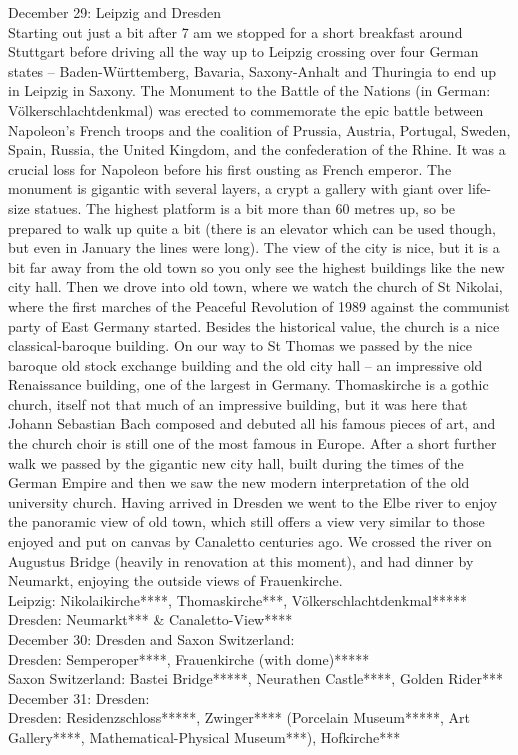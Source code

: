 December 29: Leipzig and Dresden\\
Starting out just a bit after 7 am we stopped for a short breakfast around Stuttgart before driving all the way up to Leipzig crossing over four German states -- Baden-W\"urttemberg, Bavaria, Saxony-Anhalt and Thuringia to end up in Leipzig in Saxony. The Monument to the Battle of the Nations (in German: V\"olkerschlachtdenkmal) was erected to commemorate the epic battle between Napoleon's French troops and the coalition of Prussia, Austria, Portugal, Sweden, Spain, Russia, the United Kingdom, and the confederation of the Rhine. It was a crucial loss for Napoleon before his first ousting as French emperor. The monument is gigantic with several layers, a crypt a gallery with giant over life-size statues. The highest platform is a bit more than 60 metres up, so be prepared to walk up quite a bit (there is an elevator which can be used though, but even in January the lines were long). The view of the city is nice, but it is a bit far away from the old town so you only see the highest buildings like the new city hall. Then we drove into old town, where we watch the church of St Nikolai, where the first marches of the Peaceful Revolution of 1989 against the communist party of East Germany started. Besides the historical value, the church is a nice classical-baroque building. On our way to St Thomas we passed by the nice baroque old stock exchange building and the old city hall -- an impressive old Renaissance building, one of the largest in Germany. Thomaskirche is a gothic church, itself not that much of an impressive building, but it was here that Johann Sebastian Bach composed and debuted all his famous pieces of art, and the church choir is still one of the most famous in Europe. After a short further walk we passed by the gigantic new city hall, built during the times of the German Empire and then we saw the new modern interpretation of the old university church. Having arrived in Dresden we went to the Elbe river to enjoy the panoramic view of old town, which still offers a view very similar to those enjoyed and put on canvas by Canaletto centuries ago. We crossed the river on Augustus Bridge (heavily in renovation at this moment), and had dinner by Neumarkt, enjoying the outside views of Frauenkirche.\\

Leipzig: Nikolaikirche****, Thomaskirche***, V\"olkerschlachtdenkmal*****\\
Dresden: Neumarkt*** \& Canaletto-View****\\

December 30: Dresden and Saxon Switzerland:\\

Dresden: Semperoper****, Frauenkirche (with dome)*****\\
Saxon Switzerland: Bastei Bridge*****, Neurathen Castle****, Golden Rider***\\

December 31: Dresden:\\

Dresden: Residenzschloss*****, Zwinger**** (Porcelain Museum*****, Art Gallery****, Mathematical-Physical Museum***), Hofkirche***\\


